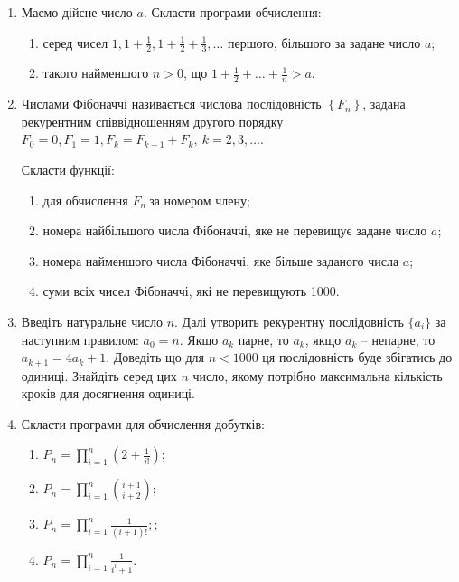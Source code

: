 \documentclass[a5paper,titlepage,openany,twoside,draft]{book_unv}%
\makeatletter
\newcommand{\xslalph}[1]{\expandafter\@xslalph\csname c@#1\endcsname}
\newcommand{\@xslalph}[1]{%
    \ifcase#1\or а\or б\or в\or г\or д\or e\or є\or ж\or з\or i%
    \or й\or к\or л\or м\or н\or о\or п\or р\or с\or т%
    \or у\or ф\or х\or ц\or ч\or ш\or ю\or я\or аа\or бб\or вв%
    \else\@ctrerr\fi%
}
\makeatother
\begin{document}
\begin{enumerate}
\def\labelenumi{\arabic{enumi})}
\item
  Маємо дійсне число $a$. Скласти програми обчислення:
\begin{enumerate}[label=\xslalph*)]
\item серед чисел
\(1,1 + \frac{1}{2},1 + \frac{1}{2} + \frac{1}{3},\ldots\) першого,
більшого за задане число $a$;

\item такого найменшого $n>0$, що
\(1 + \frac{1}{2} + \ldots + \frac{1}{n} > a.\)

\end{enumerate}

\item
  Числами Фібоначчі називається числова послідовність
  \(\left\{ F_{n} \right\}\), задана рекурентним співвідношенням другого
  порядку
  \(F_{0} = 0,F_{1} = 1,F_{k} = F_{k - 1} + F_{k},\ k = 2,3,\ldots\).

Скласти функції:
\begin{enumerate}[label=\xslalph*)]
\item
для обчислення \(F_{n}\ \)за номером члену;
\item номера найбільшого числа Фібоначчі, яке не перевищує задане число
$a$;
\item номера найменшого числа Фібоначчі, яке більше заданого числа
$a$;
\item суми всіх чисел Фібоначчі, які не перевищують 1000.

\end{enumerate}

\item
  Введіть натуральне число $n$. Далі утворить рекурентну послідовність
  \(\{a_{i}\}\) за наступним правилом: \(a_{0} = n\). Якщо \(a_{k}\) парне,
  то \(a_{k}\), якщо $a_k$ -- непарне, то\(a_{k + 1} = 4a_{k} + 1\). Доведіть
  що для $n<1000$ ця послідовність буде збігатись до
  одиниці. Знайдіть серед цих $n$ число, якому потрібно максимальна
  кількість кроків для досягнення одиниці.
\item
  Скласти програми для обчислення добутків:
\begin{enumerate}[label=\xslalph*)]
\item \(P_{n} = \prod\limits_{i = 1}^{n}\left( 2 + \frac{1}{i!} \right);\) 
\item
\(P_{n} = \prod\limits_{i = 1}^{n}\left( \frac{i + 1}{i + 2} \right);\)
\item
\(P_{n} = \prod\limits_{i = 1}^{n}\frac{1}{(i + 1)!};\); 
\item
\(P_{n} = \prod\limits_{i = 1}^{n}\frac{1}{i^{i} + 1}.\)
\end{enumerate}


\end{enumerate}
\end{document}
